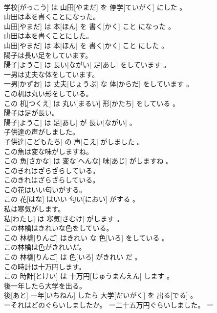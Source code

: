 \documentclass[8pt]{extreport}
\begin{document}
\begin{CJK}{UTF8}{min}
\\	学校[がっこう] は 山田[やまだ] を 停学[ていがく] にした 。
\\	山田は本を書くことになった。	
\\	山田[やまだ] は 本[ほん] を 書く[かく] こと になった 。
\\	山田は本を書くことにした。	
\\	山田[やまだ] は 本[ほん] を 書く[かく] こと にした 。
\\	陽子は長い足をしています。	
\\	陽子[ようこ] は 長い[ながい] 足[あし] をしています 。
\\	一男は丈夫な体をしています。	
\\	一男[かずお] は 丈夫[じょうぶ] な 体[からだ] をしています 。
\\	この机は丸い形をしている。	
\\	この 机[つくえ] は 丸い[まるい] 形[かたち] をしている 。
\\	陽子は足が長い。	
\\	陽子[ようこ] は 足[あし] が 長い[ながい] 。
\\	子供達の声がしました。	
\\	子供達[こどもたち] の 声[こえ] がしました 。
\\	この魚は変な味がしますね。	
\\	この 魚[さかな] は 変な[へんな] 味[あじ] がしますね 。
\\	このきれはざらざらしている。	
\\	このきれはざらざらしている。
\\	この花はいい匂いがする。	
\\	この 花[はな] はいい 匂い[におい] がする 。
\\	私は寒気がします。	
\\	私[わたし] は 寒気[さむけ] がします 。
\\	この林檎はきれいな色をしている。	
\\	この 林檎[りんご] はきれい な 色[いろ] をしている 。
\\	この林檎は色がきれいだ。	
\\	この 林檎[りんご] は 色[いろ] がきれい だ 。
\\	この時計は十万円します。	
\\	この 時計[とけい] は 十万円[じゅうまんえん] します 。
\\	後一年したら大学を出る。	
\\	後[あと] 一年[いちねん] したら 大学[だいがく] を 出る[でる] 。
\\	ーそれはどのぐらいしましたか。 ー二十五万円ぐらいしました。	ー

\end{CJK}
\end{document}
